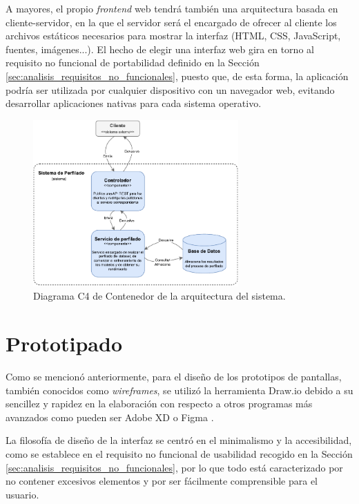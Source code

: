 \bigskip
A mayores, el propio \textit{frontend} web tendrá también una arquitectura basada en cliente-servidor, en la que el servidor será el encargado
de ofrecer al cliente los archivos estáticos necesarios para mostrar la interfaz (HTML, CSS, JavaScript, fuentes, imágenes...). El hecho
de elegir una interfaz web gira en torno al requisito no funcional de portabilidad definido en la Sección \ref{sec:analisis_requisitos_no_funcionales},
puesto que, de esta forma, la aplicación podría ser utilizada por cualquier dispositivo con un navegador web, evitando
desarrollar aplicaciones nativas para cada sistema operativo.

\bigskip
\begin{figure}[H]
	\centering
	\includegraphics[width=0.7\textwidth]{diagramas/arquitectura_contenedor.pdf}
	\caption{Diagrama C4 de Contenedor de la arquitectura del sistema.}
	\label{fig:arquitectura_contenedor}
\end{figure}

\section{Prototipado}
\label{sec:diseño_prototipado}

Como se mencionó anteriormente, para el diseño de los prototipos de pantallas, también conocidos como \textit{wireframes}, se utilizó
la herramienta Draw.io \cite{drawio} debido a su sencillez y rapidez en la elaboración con respecto a otros programas más avanzados
como pueden ser Adobe XD \cite{adobexd} o Figma \cite{figma}.

\bigskip
La filosofía de diseño de la interfaz se centró en el minimalismo y la accesibilidad, como se establece en el requisito no funcional de usabilidad
recogido en la Sección \ref{sec:analisis_requisitos_no_funcionales}, por lo que todo está caracterizado por no contener excesivos elementos y por ser fácilmente comprensible para el usuario. 

